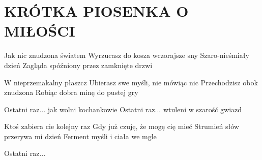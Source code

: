 \documentclass[../../../songbook.tex]{subfiles}
\begin{document}
\TabPositions{8cm} %
\section*{KRÓTKA PIOSENKA O MIŁOŚCI}
{}
\vspace{0.5cm}
Jak nic znudzona światem				 \newline
Wyrzucasz do kosza wczorajsze sny		 \newline
Szaro-nieśmiały dzień					 \newline
Zagląda spóźniony przez zamknięte drzwi	 \newline

W nieprzemakalny płaszcz \newline
Ubierasz swe myśli, nie mówiąc nic \newline
Przechodzisz obok znudzona \newline
Robiąc dobra minę do pustej gry \newline

\-\hspace{1cm} Ostatni raz... jak wolni kochankowie			 \newline
\-\hspace{1cm} Ostatni raz... wtuleni w szarość gwiazd		 \newline

Ktoś zabiera cie kolejny raz \newline
Gdy już czuję, że mogę cię mieć \newline
Strumień słów przerywa mi dzień \newline
Ferment myśli i ciała we mgle \newline

\-\hspace{1cm} Ostatni raz...  \newline
\end{document}
